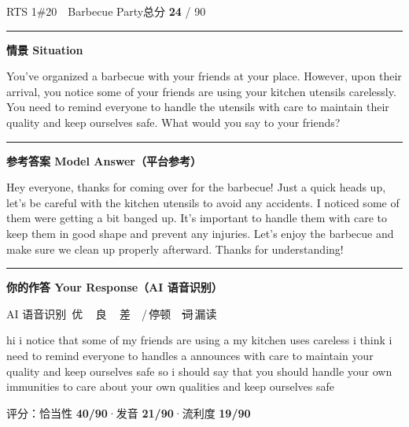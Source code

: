 \documentclass[11pt]{article}
\newcommand{\spart}[1]{\textcolor{cPartial}{\bfseries #1}} %
\newcommand{\szero}[1]{\textcolor{cWrong}{\bfseries #1}}   %
\newcommand{\ptesub}[1]{%
  \par\needspace{2\baselineskip}\smallskip
  {\color{cAccent}\rule[-0.2ex]{3pt}{1.05em}}\hspace{6pt}%
  {\bfseries\color{cHead}#1}\par\nopagebreak\smallskip}
\newcommand{\sg}[1]{\textcolor{cSpkGood}{#1}}   %
\newcommand{\sy}[1]{\textcolor{cSpkOk}{#1}}     %
\newcommand{\sr}[1]{\textcolor{cSpkBad}{#1}}    %
\newcommand{\asrlegend}{{\footnotesize\color{gray}AI 语音识别\quad
  {\color{cSpkGood}\textbullet}\,优\ \ {\color{cSpkOk}\textbullet}\,良\ \
  {\color{cSpkBad}\textbullet}\,差\ \ {\color{gray}/}\,停顿\ \
  {\color{cSpkBad}\sout{词}}\,漏读}}
\begin{document}
\begin{qblock}{RTS 1\quad \#20\ \ Barbecue Party}{总分 \textcolor{cAccent}{\bfseries 24} / 90}
\ptesub{情景 Situation}
\begin{promptbox}
You've organized a barbecue with your friends at your place. However, upon their arrival, you notice some of your friends are using your kitchen utensils carelessly. You need to remind everyone to handle the utensils with care to maintain their quality and keep ourselves safe. What would you say to your friends?
\end{promptbox}
\ptesub{参考答案 Model Answer（平台参考）}
\begin{modelbox}
Hey everyone, thanks for coming over for the barbecue! Just a quick heads up, let's be careful with the kitchen utensils to avoid any accidents. I noticed some of them were getting a bit banged up. It's important to handle them with care to keep them in good shape and prevent any injuries. Let's enjoy the barbecue and make sure we clean up properly afterward. Thanks for understanding!
\end{modelbox}
\ptesub{你的作答 Your Response（AI 语音识别）}
\asrlegend
\begin{asrbox}
\sg{hi} \sr{i} \sg{notice that} \sr{some} \sg{of my friends are using} \sy{a} \sg{my kitchen} \sy{uses} \sy{careless i think i need to remind everyone to handles a} \sr{announces} \sg{with care} \sg{to maintain} \sy{your quality and} \sy{keep ourselves safe so i should say that you should handle your own} \sy{immunities to care about your own qualities and keep ourselves} \sy{safe}
\end{asrbox}
{\small 评分：恰当性 \spart{40/90}\quad·\quad 发音 \szero{21/90}\quad·\quad 流利度 \szero{19/90}}
\end{qblock}
\end{document}
